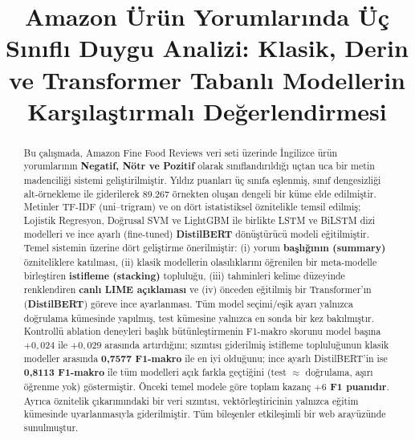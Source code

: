 \documentclass[conference]{IEEEtran}
\begin{document}
\title{Amazon Ürün Yorumlarında Üç Sınıflı Duygu Analizi: Klasik, Derin ve Transformer Tabanlı Modellerin Karşılaştırmalı Değerlendirmesi}

\author{
}

\maketitle

\begin{abstract}
Bu çalışmada, Amazon Fine Food Reviews veri seti üzerinde İngilizce ürün
yorumlarının \textbf{Negatif, Nötr ve Pozitif} olarak sınıflandırıldığı uçtan
uca bir metin madenciliği sistemi geliştirilmiştir. Yıldız puanları üç sınıfa
eşlenmiş, sınıf dengesizliği alt-örnekleme ile giderilerek 89.267 örnekten oluşan
dengeli bir küme elde edilmiştir. Metinler TF-IDF (uni--trigram) ve on dört
istatistiksel öznitelikle temsil edilmiş; Lojistik Regresyon, Doğrusal SVM ve
LightGBM ile birlikte LSTM ve BiLSTM dizi modelleri ve ince ayarlı (fine-tuned)
\textbf{DistilBERT} dönüştürücü modeli eğitilmiştir. Temel sistemin üzerine dört
geliştirme önerilmiştir: (i) yorum \textbf{başlığının (summary)} özniteliklere
katılması, (ii) klasik modellerin olasılıklarını öğrenilen bir meta-modelle
birleştiren \textbf{istifleme (stacking)} topluluğu, (iii) tahminleri kelime
düzeyinde renklendiren \textbf{canlı LIME açıklaması} ve (iv) önceden eğitilmiş bir
Transformer'ın (\textbf{DistilBERT}) göreve ince ayarlanması. Tüm model
seçimi/eşik ayarı yalnızca doğrulama kümesinde yapılmış, test kümesine yalnızca en
sonda bir kez bakılmıştır. Kontrollü ablation deneyleri başlık bütünleştirmenin
F1-makro skorunu model başına $+0,024$ ile $+0,029$ arasında artırdığını; sızıntısı
giderilmiş istifleme topluluğunun klasik modeller arasında \textbf{0,7577 F1-makro}
ile en iyi olduğunu; ince ayarlı DistilBERT'in ise \textbf{0,8113 F1-makro} ile tüm
modelleri açık farkla geçtiğini (test $\approx$ doğrulama, aşırı öğrenme yok)
göstermiştir. Önceki temel modele göre toplam kazanç \textbf{$+6$ F1 puanıdır}.
Ayrıca öznitelik çıkarımındaki bir veri sızıntısı, vektörleştiricinin yalnızca
eğitim kümesinde uyarlanmasıyla giderilmiştir. Tüm bileşenler etkileşimli bir web
arayüzünde sunulmuştur.
\end{abstract}
\end{document}
